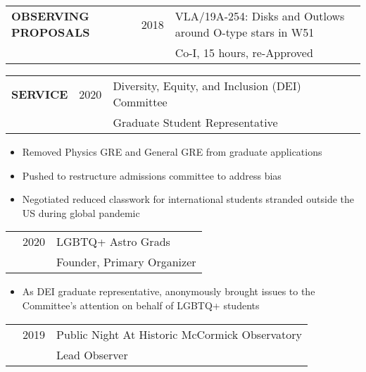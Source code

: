 \documentclass{article}
\begin{document}
\begin{tabular}{p{4cm}p{2.2cm}l}
    \large{\textbf{OBSERVING \newline PROPOSALS}} & 2018 & VLA/19A-254: Disks and Outlows around O-type stars in W51 \vspace{-0.45cm}\\
     & & \small Co-I, 15 hours, re-Approved \\
\end{tabular}
\vspace{0.5cm}


\begin{tabular}{p{4cm}p{2.2cm}l}
    \large{\textbf{SERVICE}} & 2020 & Diversity, Equity, and Inclusion (DEI) Committee  \\
                 & & \small Graduate Student Representative
\end{tabular}

\begin{itemize}[leftmargin=8.2cm, nosep]
    \small \item Removed Physics GRE and General GRE from graduate applications
    \item Pushed to restructure admissions committee to address bias
    \item Negotiated reduced classwork for international students stranded outside the US during global pandemic
\end{itemize}

\vspace{0.25cm}
\begin{tabular}{p{4cm}p{2.2cm}l}
    &2020 & LGBTQ+ Astro Grads \\
    &             & \small Founder, Primary Organizer
\end{tabular}

\begin{itemize}[leftmargin=8.2cm, nosep]
    \small \item As DEI graduate representative, anonymously brought issues to the Committee's attention on behalf of LGBTQ+ students
\end{itemize}

\vspace{0.25cm}
\begin{tabular}{p{4cm}p{2.2cm}l}
    &2019 & Public Night At Historic McCormick Observatory \\
    &             & \small Lead Observer
\end{tabular}

\end{document}
